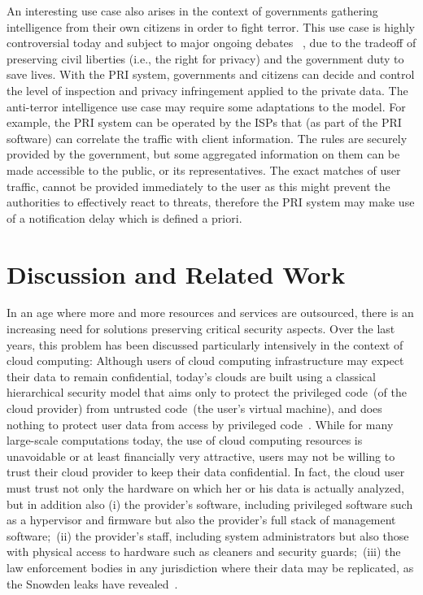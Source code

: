 \documentclass{sig-alternate-10pt}
\newcommand{\sys}{PRI\xspace}
\begin{document}
An interesting use case also arises in the context of 
governments  gathering intelligence from their own citizens 
in order to fight terror. This use case is highly controversial today and
subject to major ongoing
debates~\cite{KeysUnderDoormats} ,
due to the tradeoff of preserving civil liberties (i.e., the right for privacy) 
 and the government duty to save lives. With the \sys system, 
 governments and citizens can decide and control the level 
 of inspection and privacy infringement applied to the private data. 
The anti-terror intelligence use case may require some 
adaptations to the model. For example, the \sys system can 
be operated by the ISPs that (as part of the \sys software) can 
correlate the traffic with client information. The rules are securely provided 
by the government, but some aggregated information on them can be 
made accessible to the public, or its representatives. The exact matches of 
user traffic, cannot be provided immediately to the user as this might 
prevent the authorities to effectively react to threats, therefore the \sys system 
may make use of a notification delay which is defined a priori. 




\section{Discussion and Related Work}\label{sec:discussion}



In an age where more and more resources
and services are outsourced, 
there is an increasing need for solutions
preserving critical security aspects.
Over the last years, this problem
has been discussed particularly intensively
in the context of cloud computing:
Although users of cloud computing infrastructure may
expect their data to remain confidential, today's clouds
are built using a classical hierarchical security model that
aims only to protect the privileged code~(of the cloud
provider) from untrusted code~(the user's virtual machine),
and does nothing to protect user data from access
by privileged code~\cite{haven}.
While for many large-scale computations
today, the use of cloud computing resources
is unavoidable or at least financially 
very attractive, users may not be willing
to trust their cloud provider 
to keep their data confidential.
In fact, the cloud user must trust
not only the hardware on which her or his
data is actually analyzed, but in addition
also  
(i) the provider's software, including privileged software
such as a hypervisor and firmware but also the provider's
full stack of management software;~(ii) the provider's
staff, including system administrators but also those with
physical access to hardware such as cleaners and security
guards;~(iii) the law
enforcement bodies in any jurisdiction where their data
may be replicated, as the Snowden leaks have
revealed~\cite{haven,snowden}.
\end{document}
